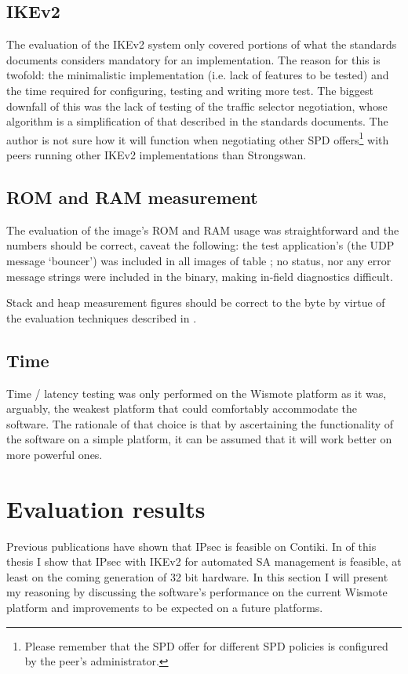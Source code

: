 \documentclass[final,a4paper,twoside,11pt,onecolumn]{report}
\begin{document}
\subsection{IKEv2}
The evaluation of the IKEv2 system only covered portions of what the standards documents considers mandatory for an implementation. The reason for this is twofold: the minimalistic implementation (i.e. lack of features to be tested) and the time required for configuring, testing and writing more test. The biggest downfall of this was the lack of testing of the traffic selector negotiation, whose algorithm is a simplification of that described in the standards documents. The author is not sure how it will function when negotiating other SPD offers\footnote{Please remember that the SPD offer for different SPD policies is configured by the peer's administrator.} with peers running other IKEv2 implementations than Strongswan.

\subsection{ROM and RAM measurement}
The evaluation of the image's ROM and RAM usage was straightforward and the numbers should be correct, caveat the following: the test application's (the UDP message `bouncer') was included in all images of table ; no status, nor any error message strings were included in the binary, making in-field diagnostics difficult.

Stack and heap measurement figures should be correct to the byte by virtue of the evaluation techniques described in .

\subsection{Time}
Time / latency testing was only performed on the Wismote platform as it was, arguably, the weakest platform that could comfortably accommodate the software. The rationale of that choice is that by ascertaining the functionality of the software on a simple platform, it can be assumed that it will work better on more powerful ones.


\section{Evaluation results}
Previous publications\cite{raza11securing} have shown that IPsec is feasible on Contiki. In  of this thesis I show that IPsec with IKEv2 for automated SA management is feasible, at least on the coming generation of 32 bit hardware. In this section I will present my reasoning by discussing the software's performance on the current Wismote platform and improvements to be expected on a future platforms.
\end{document}

